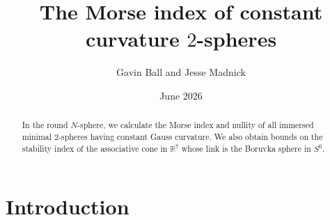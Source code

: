 \documentclass[11pt]{article}
\title{The Morse index of constant curvature $2$-spheres}
\author{Gavin Ball and Jesse Madnick}
\date{June 2026}
\newcommand{\R}{\mathbb{R}}
\theoremstyle{definition}
\numberwithin{equation}{section}
\begin{document}
\maketitle



\begin{abstract} In the round $N$-sphere, we calculate the Morse index and nullity of all immersed minimal $2$-spheres having constant Gauss curvature.  We also obtain bounds on the stability index of the associative cone in $\R^7$ whose link is the Boruvka sphere in $S^6$.
\end{abstract}

\tableofcontents

\section{Introduction} \label{sec:Intro}
\end{document}
